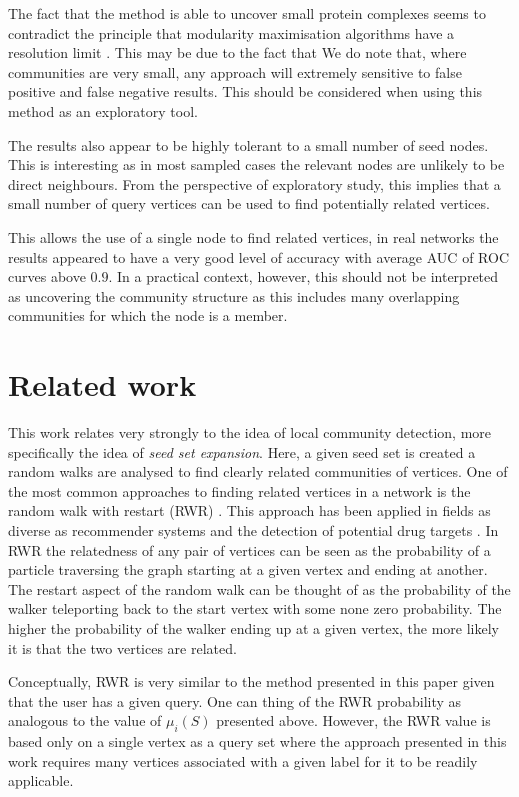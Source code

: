 \documentclass[manuscript, proceedings]{acmart}
\begin{document}
The fact that the method is able to uncover small protein complexes seems to contradict the principle that modularity maximisation algorithms have a resolution limit \cite{}.
This may be due to the fact that
We do note that, where communities are very small, any approach will extremely sensitive to false positive and false negative results.
This should be considered when using this method as an exploratory tool.

The results also appear to be highly tolerant to a small number of seed nodes.
This is interesting as in most sampled cases the relevant nodes are unlikely to be direct neighbours.
From the perspective of exploratory study, this implies that a small number of query vertices can be used to find potentially related vertices.

This allows the use of a single node to find related vertices, in real networks the results appeared to have a very good level of accuracy with average AUC of ROC curves above $0.9$.
In a practical context, however, this should not be interpreted as uncovering the community structure as this includes many overlapping communities for which the node is a member.


\section{Related work}
\label{sec:related_work}

This work relates very strongly to the idea of local community detection, more specifically the idea of \textit{seed set expansion}.
Here, a given seed set is created a random walks are analysed to find clearly related communities of vertices.
One of the most common approaches to finding related vertices in a network is the random walk with restart (RWR) \cite{can2005analysis, kohler2008walking}.
This approach has been applied in fields as diverse as recommender systems and the detection of potential drug targets \cite{chen2012drug}.
In RWR the relatedness of any pair of vertices can be seen as the probability of a particle traversing the graph starting at a given vertex and ending at another.
The restart aspect of the random walk can be thought of as the probability of the walker teleporting back to the start vertex with some none zero probability. 
The higher the probability of the walker ending up at a given vertex, the more likely it is that the two vertices are related.

Conceptually, RWR is very similar to the method presented in this paper given that the user has a given query.
One can thing of the RWR probability as analogous to the value of $\mu_i(S)$ presented above.
However, the RWR value is based only on a single vertex as a query set where the approach presented in this work requires many vertices associated with a given label for it to be readily applicable.
\end{document}
